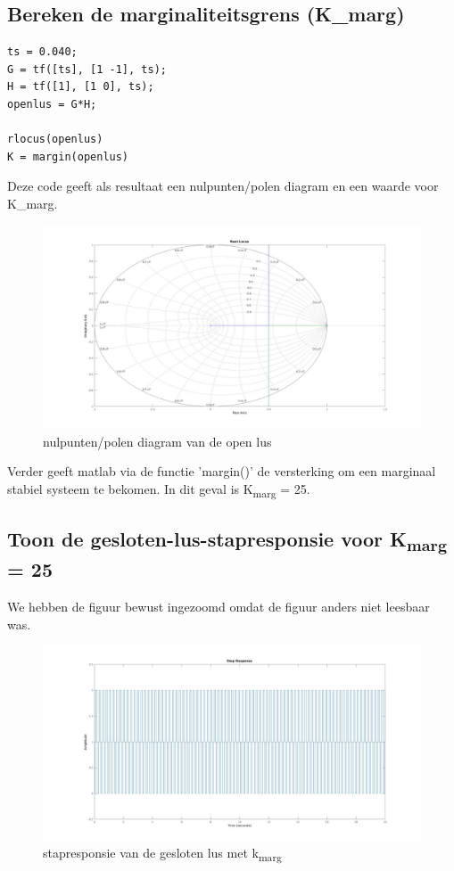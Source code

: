 \documentclass[a4paper, 12pt]{article}
\begin{document}
\subsection{Bereken de marginaliteitsgrens (K\_marg)}

\begin{lstlisting}
ts = 0.040;
G = tf([ts], [1 -1], ts);
H = tf([1], [1 0], ts);
openlus = G*H;

rlocus(openlus)
K = margin(openlus)
\end{lstlisting}

Deze code geeft als resultaat een nulpunten/polen diagram en een waarde voor K\_marg.

\begin{figure}[!h]
	\includegraphics[width=1\linewidth]{Labo3_4_rootlocus.jpg}
	\caption{nulpunten/polen diagram van de open lus}
\end{figure}

Verder geeft matlab via de functie 'margin()' de versterking om een marginaal stabiel systeem te bekomen. In dit geval is K\textsubscript{marg} = 25.

\newpage

\subsection{Toon de gesloten-lus-stapresponsie voor K\textsubscript{marg} = 25}

We hebben de figuur bewust ingezoomd omdat de figuur anders niet leesbaar was.

\begin{figure}[!h]
	\includegraphics[width=1\linewidth]{Labo3_4_step_response.jpg}
	\caption{stapresponsie van de gesloten lus met k\textsubscript{marg}}
\end{figure}
\end{document}
